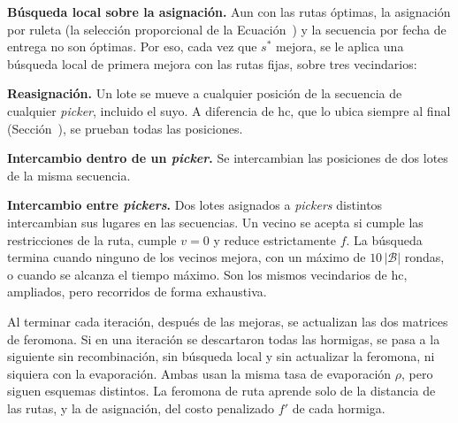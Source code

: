 {\bf Búsqueda local sobre la asignación.} Aun con las rutas óptimas, la
asignación por ruleta (la selección proporcional de la
Ecuación~) y la secuencia por fecha de entrega no son óptimas.
Por eso, cada vez que $s^*$ mejora, se le aplica una búsqueda local de
primera mejora con las rutas fijas, sobre tres vecindarios:
\startitemize[n]
	\item {\bf Reasignación.} Un lote se mueve a cualquier posición de la
	secuencia de cualquier {\em picker}, incluido el suyo. A diferencia de
	\ac{hc}, que lo ubica siempre al final
	(Sección~), se prueban todas las posiciones.
	\item {\bf Intercambio dentro de un {\em picker}.} Se intercambian las
	posiciones de dos lotes de la misma secuencia.
	\item {\bf Intercambio entre {\em pickers}.} Dos lotes asignados a
	{\em pickers} distintos intercambian sus lugares en las secuencias.
\stopitemize
Un vecino se acepta si cumple las restricciones de la ruta, cumple $v = 0$ y
reduce estrictamente $f$. La búsqueda termina
cuando ninguno de los vecinos mejora, con un máximo de $10 \, |\mathcal{B}|$
rondas, o cuando se alcanza el tiempo máximo. Son los mismos vecindarios
de \ac{hc}, ampliados, pero recorridos de forma exhaustiva.

\stopsubsection

\startsubsection[title={Actualización de feromonas}, reference=sec:aco_feromonas]

Al terminar cada iteración, después de las mejoras, se actualizan las dos
matrices de feromona. Si en una iteración se descartaron todas las hormigas,
se pasa a la siguiente sin recombinación, sin búsqueda local y sin
actualizar la feromona, ni siquiera con la evaporación. Ambas usan la misma tasa de evaporación $\rho$, pero
siguen esquemas distintos. La feromona de ruta aprende solo de la distancia
de las rutas, y la de asignación, del costo penalizado $f'$ de cada hormiga.

